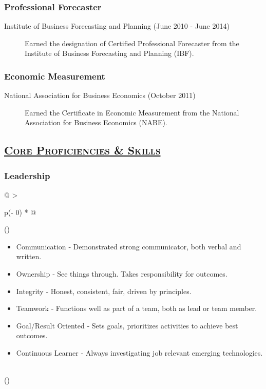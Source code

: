 \documentclass[
  letterpaper,
  DIV=11,
  numbers=noendperiod]{scrartcl}
\providecommand{\tightlist}{%
  \setlength{\itemsep}{0pt}\setlength{\parskip}{0pt}}\usepackage{longtable,booktabs,array}
\begin{document}
\hypertarget{professional-forecaster}{%
\subsubsection{Professional Forecaster}\label{professional-forecaster}}

\begin{description}
\item[Institute of Business Forecasting and Planning (June 2010 - June
2014)]
Earned the designation of Certified Professional Forecaster from the
Institute of Business Forecasting and Planning (IBF).
\end{description}

\hypertarget{economic-measurement}{%
\subsubsection{Economic Measurement}\label{economic-measurement}}

\begin{description}
\item[National Association for Business Economics (October 2011)]
Earned the Certificate in Economic Measurement from the National
Association for Business Economics (NABE).
\end{description}

\hypertarget{core-proficiencies-skills}{%
\subsection{\texorpdfstring{\textsc{\uline{Core Proficiencies \&
Skills}}}{Core Proficiencies \& Skills}}\label{core-proficiencies-skills}}

\hypertarget{leadership}{%
\subsubsection{Leadership}\label{leadership}}

\begin{longtable}[]{@{}
  >{\raggedright\arraybackslash}p{(\columnwidth - 0\tabcolsep) * }@{}}
\toprule()
\endhead
\begin{minipage}[t]{\linewidth}\raggedright
\begin{itemize}
\tightlist
\item
  Communication ‐ Demonstrated strong communicator, both verbal and
  written.
\item
  Ownership ‐ See things through. Takes responsibility for outcomes.
\item
  Integrity ‐ Honest, consistent, fair, driven by principles.
\item
  Teamwork ‐ Functions well as part of a team, both as lead or team
  member.
\item
  Goal/Result Oriented ‐ Sets goals, prioritizes activities to achieve
  best outcomes.
\item
  Continuous Learner ‐ Always investigating job relevant emerging
  technologies.
\end{itemize}
\end{minipage} \\
\bottomrule()
\end{longtable}
\end{document}
